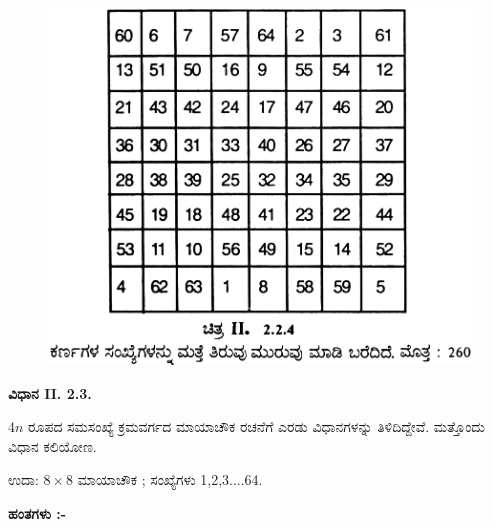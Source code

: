 \begin{itemize}
	\begin{figure}[H]
	\includegraphics[scale=1.1]{src/figures/chap3/fig3-23.jpg}
	\end{figure}
\end{itemize}

\noindent \textbf{ವಿಧಾನ II. 2.3.}

$4n$ ರೂಪದ ಸಮಸಂಖ್ಯೆ ಕ್ರಮವರ್ಗದ ಮಾಯಾಚೌಕ ರಚನೆಗೆ ಎರಡು ವಿಧಾನಗಳನ್ನು ತಿಳಿದಿದ್ದೇವೆ. ಮತ್ತೊಂದು ವಿಧಾನ ಕಲಿಯೋಣ.

ಉದಾ: $8 \times 8$ ಮಾಯಾಚೌಕ ; ಸಂಖ್ಯೆಗಳು 1,2,3....64.

\medskip
\noindent \textbf{ಹಂತಗಳು :-}

